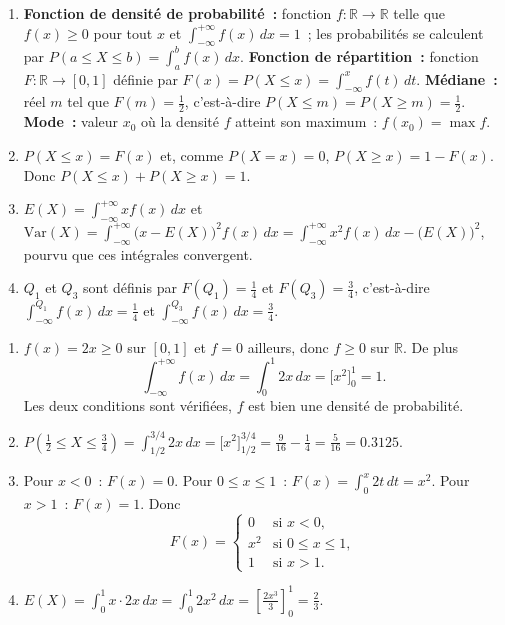 \documentclass[11pt]{article}
\begin{document}
\begin{corrige}
\begin{enumerate}
\item \textbf{Fonction de densité de probabilité~:} fonction $f : \mathbb{R} \to \mathbb{R}$ telle que $f(x) \geq 0$ pour tout $x$ et $\displaystyle\int_{-\infty}^{+\infty} f(x)\,dx = 1$~; les probabilités se calculent par $P(a \leq X \leq b) = \displaystyle\int_a^b f(x)\,dx$.
\textbf{Fonction de répartition~:} fonction $F : \mathbb{R} \to [0,1]$ définie par $F(x) = P(X \leq x) = \displaystyle\int_{-\infty}^{x} f(t)\,dt$.
\textbf{Médiane~:} réel $m$ tel que $F(m) = \tfrac{1}{2}$, c'est-à-dire $P(X \leq m) = P(X \geq m) = \tfrac12$.
\textbf{Mode~:} valeur $x_0$ où la densité $f$ atteint son maximum~: $f(x_0) = \max f$.
\item $P(X \leq x) = F(x)$ et, comme $P(X = x) = 0$, $P(X \geq x) = 1 - F(x)$. Donc $P(X \leq x) + P(X \geq x) = 1$.
\item $\displaystyle E(X) = \int_{-\infty}^{+\infty} x f(x)\,dx$ et $\displaystyle \mathrm{Var}(X) = \int_{-\infty}^{+\infty} \big(x - E(X)\big)^2 f(x)\,dx = \int_{-\infty}^{+\infty} x^2 f(x)\,dx - \big(E(X)\big)^2$, pourvu que ces intégrales convergent.
\item $Q_1$ et $Q_3$ sont définis par $F(Q_1) = \tfrac{1}{4}$ et $F(Q_3) = \tfrac{3}{4}$, c'est-à-dire $\displaystyle\int_{-\infty}^{Q_1} f(x)\,dx = \tfrac14$ et $\displaystyle\int_{-\infty}^{Q_3} f(x)\,dx = \tfrac34$.
\end{enumerate}
\end{corrige}

\begin{corrige}[{Exercice 4 — Calculs directs : $f(x)=2x$ sur $[0,1]$}]
\begin{enumerate}
\item $f(x) = 2x \geq 0$ sur $[0,1]$ et $f = 0$ ailleurs, donc $f \geq 0$ sur $\mathbb{R}$. De plus
\[ \int_{-\infty}^{+\infty} f(x)\,dx = \int_0^1 2x\,dx = \Big[x^2\Big]_0^1 = 1. \]
Les deux conditions sont vérifiées, $f$ est bien une densité de probabilité.
\item $\displaystyle P\!\left(\tfrac12 \leq X \leq \tfrac34\right) = \int_{1/2}^{3/4} 2x\,dx = \Big[x^2\Big]_{1/2}^{3/4} = \frac{9}{16} - \frac{1}{4} = \frac{5}{16} = 0.3125.$
\item Pour $x < 0$~: $F(x) = 0$. Pour $0 \leq x \leq 1$~: $F(x) = \displaystyle\int_0^x 2t\,dt = x^2$. Pour $x > 1$~: $F(x) = 1$. Donc
\[ F(x) = \begin{cases} 0 & \text{si } x < 0, \\ x^2 & \text{si } 0 \leq x \leq 1, \\ 1 & \text{si } x > 1. \end{cases} \]
\item $\displaystyle E(X) = \int_0^1 x \cdot 2x\,dx = \int_0^1 2x^2\,dx = \left[\frac{2x^3}{3}\right]_0^1 = \frac{2}{3}.$
\end{enumerate}
\end{corrige}
\end{document}
